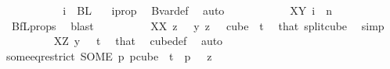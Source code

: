 \begin{isabellebody}
\ \ \ \ \ \ \ \ \isamarkupfalse%
\ \isamarkupfalse%
\ {\isachardoublequoteopen}i\ {\isasymin}\ BL\ {}{\isachardoublequoteclose}\ \isamarkupfalse%
\ i{\isacharunderscore}{\kern0pt}prop\ \isamarkupfalse%
\ Bvar{\isacharunderscore}{\kern0pt}def\ \isamarkupfalse%
\ auto\isanewline
\ \ \ \ \ \ \ \ \isamarkupfalse%
\ \isamarkupfalse%
\ XY{\isacharcolon}{\kern0pt}\ {\isachardoublequoteopen}i\ {\isasymin}\ {\isacharbraceleft}{\kern0pt}{\isachardot}{\kern0pt}{\isachardot}{\kern0pt}{\isacharless}{\kern0pt}n{\isacharbraceright}{\kern0pt}{\isachardoublequoteclose}\ \isamarkupfalse%
\ {}\ BfL{\isacharunderscore}{\kern0pt}props{\isacharparenleft}{\kern0pt}{}{\isacharparenright}{\kern0pt}\ \isamarkupfalse%
\ blast\isanewline
\ \ \ \ \ \ \ \ \isamarkupfalse%
\ XX{\isacharcolon}{\kern0pt}\ {\isachardoublequoteopen}{\isacharparenleft}{\kern0pt}{\isasymlambda}z\ {\isasymin}\ {\isacharbraceleft}{\kern0pt}{\isachardot}{\kern0pt}{\isachardot}{\kern0pt}{\isacharless}{\kern0pt}{}{\isacharbraceright}{\kern0pt}{\isachardot}{\kern0pt}\ y\ z{\isacharparenright}{\kern0pt}\ \ {\isasymin}\ cube\ {}\ {\isacharparenleft}{\kern0pt}t{\isacharplus}{\kern0pt}{}{\isacharparenright}{\kern0pt}{\isachardoublequoteclose}\ \isamarkupfalse%
\ that\ split{\isacharunderscore}{\kern0pt}cube\ \isamarkupfalse%
\ simp\isanewline
\ \ \ \ \ \ \ \ \isamarkupfalse%
\ XZ{\isacharcolon}{\kern0pt}\ {\isachardoublequoteopen}y\ {}\ {\isasymin}\ {\isacharbraceleft}{\kern0pt}{\isachardot}{\kern0pt}{\isachardot}{\kern0pt}{\isacharless}{\kern0pt}t{\isacharplus}{\kern0pt}{}{\isacharbraceright}{\kern0pt}{\isachardoublequoteclose}\ \isamarkupfalse%
\ that\ \isamarkupfalse%
\ cube{\isacharunderscore}{\kern0pt}def\ \isamarkupfalse%
\ auto\isanewline
\isanewline
\ \ \ \ \ \ \ \ \isamarkupfalse%
\ some{\isacharunderscore}{\kern0pt}eq{\isacharunderscore}{\kern0pt}restrict{\isacharcolon}{\kern0pt}\ {\isachardoublequoteopen}{\isacharparenleft}{\kern0pt}SOME\ p{\isachardot}{\kern0pt}\ p{\isasymin}cube\ {}\ {\isacharparenleft}{\kern0pt}t{\isacharplus}{\kern0pt}{}{\isacharparenright}{\kern0pt}\ {\isasymand}\ p\ {}\ {\isacharequal}{\kern0pt}\ {\isacharparenleft}{\kern0pt}{\isacharparenleft}{\kern0pt}{\isasymlambda}z\ {\isasymin}\ {\isacharbraceleft}{\kern0pt}{\isachardot}{\kern0pt}{\isachardot}{\kern0pt}{\isacharless}{\kern0pt}{}{\isacharbraceright}{\kern0pt}{\isachardot}{\kern0pt}\isanewline

\end{isabellebody}
